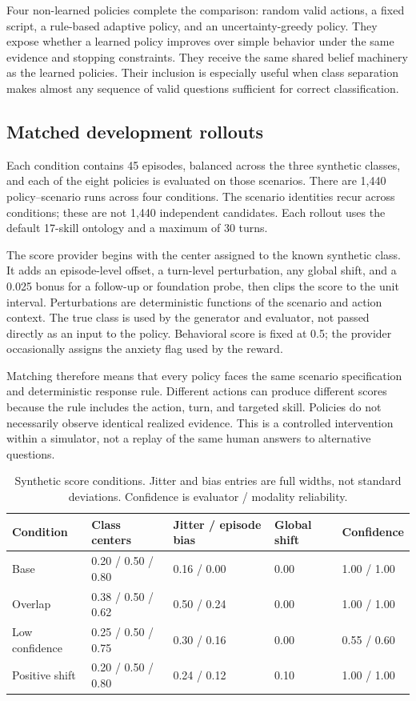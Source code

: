 \documentclass[10pt,a4paper]{article}
\begin{document}
Four non-learned policies complete the comparison: random valid actions, a fixed script, a rule-based adaptive policy, and an uncertainty-greedy policy. They expose whether a learned policy improves over simple behavior under the same evidence and stopping constraints. They receive the same shared belief machinery as the learned policies. Their inclusion is especially useful when class separation makes almost any sequence of valid questions sufficient for correct classification.

\subsection{Matched development rollouts}
Each condition contains 45 episodes, balanced across the three synthetic classes, and each of the eight policies is evaluated on those scenarios. There are 1,440 policy--scenario runs across four conditions. The scenario identities recur across conditions; these are not 1,440 independent candidates. Each rollout uses the default 17-skill ontology and a maximum of 30 turns.

The score provider begins with the center assigned to the known synthetic class. It adds an episode-level offset, a turn-level perturbation, any global shift, and a 0.025 bonus for a follow-up or foundation probe, then clips the score to the unit interval. Perturbations are deterministic functions of the scenario and action context. The true class is used by the generator and evaluator, not passed directly as an input to the policy. Behavioral score is fixed at 0.5; the provider occasionally assigns the anxiety flag used by the reward.

Matching therefore means that every policy faces the same scenario specification and deterministic response rule. Different actions can produce different scores because the rule includes the action, turn, and targeted skill. Policies do not necessarily observe identical realized evidence. This is a controlled intervention within a simulator, not a replay of the same human answers to alternative questions.

\begin{table}[htbp]
\centering\small
\caption{Synthetic score conditions. Jitter and bias entries are full widths, not standard deviations. Confidence is evaluator / modality reliability.}
\label{tab:conditions}
\begin{tabularx}{\linewidth}{p{25mm}YYYY}
\toprule
Condition & Class centers & Jitter / episode bias & Global shift & Confidence \\ \midrule
Base & 0.20 / 0.50 / 0.80 & 0.16 / 0.00 & 0.00 & 1.00 / 1.00 \\
Overlap & 0.38 / 0.50 / 0.62 & 0.50 / 0.24 & 0.00 & 1.00 / 1.00 \\
Low confidence & 0.25 / 0.50 / 0.75 & 0.30 / 0.16 & 0.00 & 0.55 / 0.60 \\
Positive shift & 0.20 / 0.50 / 0.80 & 0.24 / 0.12 & 0.10 & 1.00 / 1.00 \\
\bottomrule
\end{tabularx}
\end{table}
\end{document}

